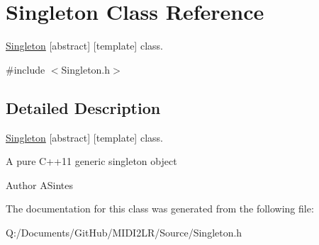 \hypertarget{class_singleton}{}\section{Singleton Class Reference}
\label{class_singleton}


\hyperlink{class_singleton}{Singleton} \mbox{[}abstract\mbox{]} \mbox{[}template\mbox{]} class.  




{\ttfamily \#include $<$Singleton.\+h$>$}



\subsection{Detailed Description}
\hyperlink{class_singleton}{Singleton} \mbox{[}abstract\mbox{]} \mbox{[}template\mbox{]} class. 

A pure C++11 generic singleton object \begin{DoxyAuthor}{Author}
A\+Sintes 
\end{DoxyAuthor}


The documentation for this class was generated from the following file\+:\begin{DoxyCompactItemize}
\item 
Q\+:/\+Documents/\+Git\+Hub/\+M\+I\+D\+I2\+L\+R/\+Source/Singleton.\+h\end{DoxyCompactItemize}
